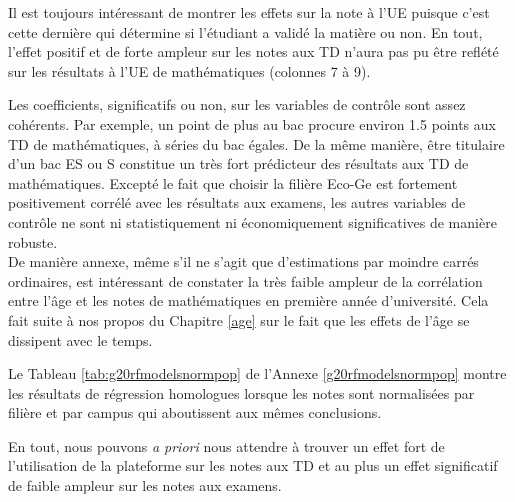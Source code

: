 \documentclass[
]{book}
\begin{document}
Il est toujours intéressant de montrer les effets sur la note à l'UE puisque c'est cette dernière qui détermine si l'étudiant a validé la matière ou non. En tout, l'effet positif et de forte ampleur sur les notes aux TD n'aura pas pu être reflété sur les résultats à l'UE de mathématiques (colonnes 7 à 9).

\quad Les coefficients, significatifs ou non, sur les variables de contrôle sont assez cohérents. Par exemple, un point de plus au bac procure environ 1.5 points aux TD de mathématiques, à séries du bac égales. De la même manière, être titulaire d'un bac ES ou S constitue un très fort prédicteur des résultats aux TD de mathématiques. Excepté le fait que choisir la filière Eco-Ge est fortement positivement corrélé avec les résultats aux examens, les autres variables de contrôle ne sont ni statistiquement ni économiquement significatives de manière robuste.\\
De manière annexe, même s'il ne s'agit que d'estimations par moindre carrés ordinaires, est intéressant de constater la très faible ampleur de la corrélation entre l'âge et les notes de mathématiques en première année d'université. Cela fait suite à nos propos du Chapitre \ref{age} sur le fait que les effets de l'âge se dissipent avec le temps.

Le Tableau \ref{tab:g20rfmodelsnormpop} de l'Annexe \ref{g20rfmodelsnormpop} montre les résultats de régression homologues lorsque les notes sont normalisées par filière et par campus qui aboutissent aux mêmes conclusions.

\quad En tout, nous pouvons \emph{a priori} nous attendre à trouver un effet fort de l'utilisation de la plateforme sur les notes aux TD et au plus un effet significatif de faible ampleur sur les notes aux examens.
\end{document}
